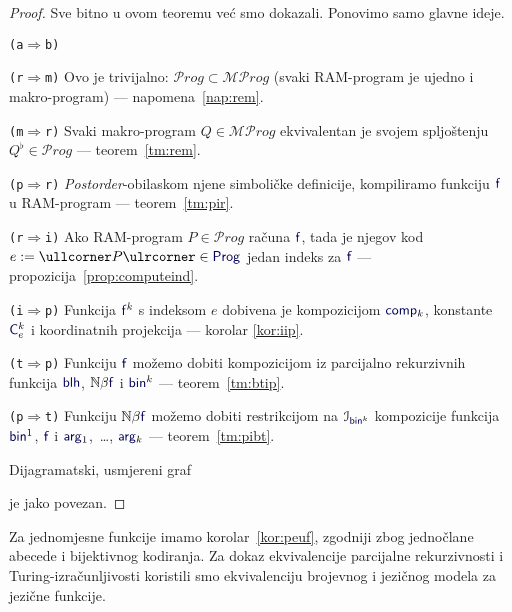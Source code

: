 \begin{proof}
Sve bitno u ovom teoremu već smo dokazali. Ponovimo samo glavne ideje.

\begin{labeling}{\texttt{(a$\Rightarrow$b)}}
    \item[\texttt{(r$\Rightarrow$m)}] Ovo je trivijalno: $\mathscr Prog\subset\mathscr{MP}rog$ (svaki RAM-program je ujedno i makro-program) --- napomena~\ref{nap:rem}.
    \item[\texttt{(m$\Rightarrow$r)}] Svaki makro-program $Q\in\mathscr{MP}rog$ ekvivalentan je svojem spljoštenju $Q^\flat\in\mathscr Prog$ --- teorem~\ref{tm:rem}.
    \item[\texttt{(p$\Rightarrow$r)}] \emph{Postorder}-obilaskom njene simboličke definicije, kompiliramo funkciju $\f f$ u RAM-program --- teorem~\ref{tm:pir}.
    \item[\texttt{(r$\Rightarrow$i)}] Ako RAM-program $P\in\mathscr Prog$ računa $\f f$, tada je njegov kod $e:=\kprog P\in\f{Prog}$ jedan indeks za $ \f f$ --- propozicija~\ref{prop:computeind}.
    \item[\texttt{(i$\Rightarrow$p)}] Funkcija $\f f^k$ s indeksom $e$ dobivena je kompozicijom $\f{comp}_k$, konstante $\f C_e^k$ i koordinatnih projekcija --- korolar \ref{kor:iip}.
    \item[\texttt{(t$\Rightarrow$p)}] Funkciju $\f f$ možemo dobiti kompozicijom iz parcijalno rekurzivnih funkcija $\f{blh}$, $\N\beta\f f$ i $\f{bin}^k$ --- teorem~\ref{tm:btip}.
    \item[\texttt{(p$\Rightarrow$t)}] Funkciju $\N\beta\f f$ možemo dobiti restrikcijom na $\im{\f{bin}^k}$ kompozicije funkcija $\f{bin}^1$, $\f f$ i $\f{arg}_1$,~\ldots, $\f{arg}_k$ --- teorem~\ref{tm:pibt}.
\end{labeling}
Dijagramatski, usmjereni graf\quad
{} je jako povezan.
\end{proof}

Za jednomjesne funkcije imamo korolar~\ref{kor:peuf}, zgodniji zbog jednočlane abecede i bijektivnog kodiranja. Za dokaz ekvivalencije parcijalne rekurzivnosti i Turing-izračunljivosti koristili smo ekvivalenciju brojevnog i jezičnog modela za jezične funkcije.

